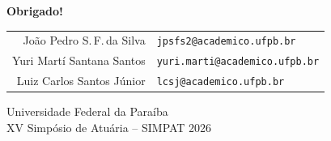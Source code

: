 \documentclass[aspectratio=169, 10pt]{beamer}
\begin{document}
\begin{frame}[plain]
  \begin{center}
    \vspace{1.5cm}
    {\Large \textbf{Obrigado!}}


    \bigskip\bigskip
    \begin{tabular}{rl}
      João Pedro S.\,F.\,da Silva & \texttt{jpsfs2@academico.ufpb.br} \\
      Yuri Martí Santana Santos   & \texttt{yuri.marti@academico.ufpb.br} \\
      Luiz Carlos Santos Júnior   & \texttt{lcsj@academico.ufpb.br} \\
    \end{tabular}

    \bigskip
    {\small Universidade Federal da Paraíba\\
            XV Simpósio de Atuária -- SIMPAT 2026}
  \end{center}
\end{frame}
\end{document}
